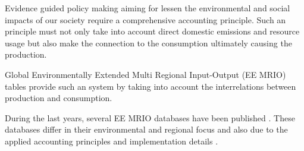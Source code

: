 Evidence guided policy making aiming for lessen the environmental and social
impacts of our society require a comprehensive accounting principle. Such an principle must not only take into account direct domestic emissions and resource usage but also make the connection to the consumption ultimately causing the production.

Global Environmentally Extended Multi Regional Input-Output (EE MRIO) tables provide such an system by taking into account the interrelations between production and consumption. 

During the last years, several EE MRIO databases have been published \cite{Tukker_2013}. These databases differ in their environmental and regional focus and also due to the applied accounting principles and implementation details \cite{Stadler_2014} \cite{Owen_2014} \cite{Moran_2014}. 
